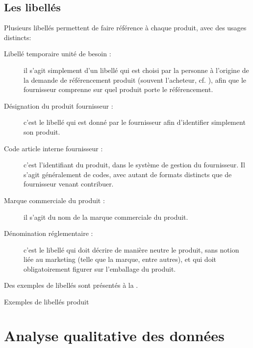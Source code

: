             \subsection{Les libellés}
            \label{libelles}

            Plusieurs libellés permettent de faire référence à chaque produit, avec des usages distincts:
            \begin{description}
                \item[Libellé temporaire unité de besoin :] il s'agit simplement d'un libellé qui est choisi par la personne à l'origine de la demande de référencement produit (souvent l'acheteur, cf. ), afin que le fournisseur comprenne sur quel produit porte le référencement.
                \item[Désignation du produit fournisseur :] c'est le libellé qui est donné par le fournisseur afin d'identifier simplement son produit.
                \item[Code article interne fournisseur :] c'est l'identifiant du produit, dans le système de gestion du fournisseur. Il s'agit généralement de codes, avec autant de formats distincts que de fournisseur venant contribuer.
                \item[Marque commerciale du produit :] il s'agit du nom de la marque commerciale du produit. 
                \item[Dénomination réglementaire :] c'est le libellé qui doit décrire de manière neutre le produit, sans notion liée au marketing (telle que la marque, entre autres), et qui doit obligatoirement figurer sur l'emballage du produit.
                \end{description}

            Des exemples de libellés sont présentés à la .

            {\renewcommand{\arraystretch}{2}%
            \begin{table}[htbp]
                {\scriptsize
                \begin{center}%
                \caption{Exemples de libellés produit}%
                \label{tbl:exemple_lib}%
                \end{center}%
                }
            \end{table}
            }



        \section{Analyse qualitative des données}
        
